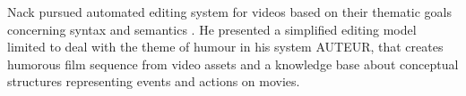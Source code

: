 Nack pursued automated editing system for videos based on their thematic goals concerning syntax and semantics \cite{nack1997application}.
He presented a simplified editing model limited to deal with the theme of humour in his system AUTEUR, that creates humorous film sequence from video assets and a knowledge base about conceptual structures representing events and actions on movies.
